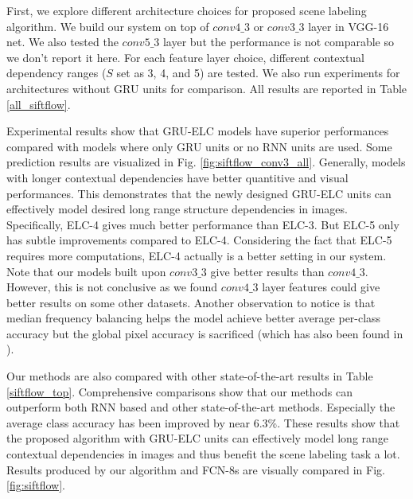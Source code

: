 \documentclass[10pt,twocolumn,letterpaper]{article}
\begin{document}
First, we explore different architecture choices for proposed scene labeling algorithm. We build our system on top of $conv4\_3$ or $conv3\_3$ layer in VGG-16 net. We also tested the $conv5\_3$ layer but the performance is not comparable so we don't report it here. For each feature layer choice, different contextual dependency ranges ($S$ set as 3, 4, and 5) are tested. We also run experiments for architectures without GRU units for comparison. All results are reported in Table \ref{all_siftflow}. 

Experimental results show that GRU-ELC models have superior performances compared with models where only GRU units or no RNN units are used. Some prediction results are visualized in Fig. \ref{fig:siftflow_conv3_all}. Generally, models with longer contextual dependencies have better quantitive and visual performances. This demonstrates that the newly designed GRU-ELC units can effectively model desired long range structure dependencies in images. Specifically, ELC-4 gives much better performance than ELC-3. But ELC-5 only has subtle improvements compared to ELC-4. Considering the fact that ELC-5 requires more computations, ELC-4 actually is a better setting in our system. Note that our models built upon $conv3\_3$ give better results than $conv4\_3$. However, this is not conclusive as we found $conv4\_3$ layer features could give better results on some other datasets. Another observation to notice is that median frequency balancing helps the model achieve better average per-class accuracy but the global pixel accuracy is sacrificed (which has also been found in \cite{5, 2, 1, 36}).


Our methods are also compared with other state-of-the-art results in Table \ref{siftflow_top}. Comprehensive comparisons show that our methods can outperform both RNN based and other state-of-the-art methods. Especially the average class accuracy has been improved by near 6.3\%. These results show that the proposed algorithm with GRU-ELC units can effectively model long range contextual dependencies in images and thus benefit the scene labeling task a lot. Results produced by our algorithm and FCN-8s \cite{3} are visually compared in Fig.\ref{fig:siftflow}.
\end{document}
